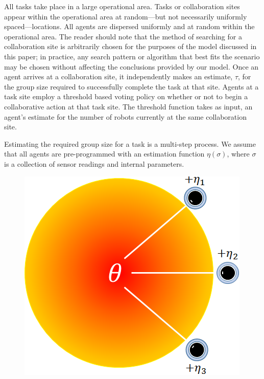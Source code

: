 \documentclass[conference]{IEEETran}
\begin{document}
All tasks take place in a large operational area. Tasks or collaboration sites appear within the operational area at random---but not necessarily uniformly spaced---locations. All agents are dispersed uniformly and at random within the operational area. The reader should note that the method of searching for a collaboration site is arbitrarily chosen for the purposes of the model discussed in this paper; in practice, any search pattern or algorithm that best fits the scenario may be chosen without affecting the conclusions provided by our model. Once an agent arrives at a collaboration site, it independently makes an estimate, $\tau$, for the group size required to successfully complete the task at that site. Agents at a task site employ a threshold based voting policy on whether or not to begin a collaborative action at that task site. The threshold function takes as input, an agent's estimate for the number of robots currently at the same collaboration site.

Estimating the required group size for a task is a multi-step process. We assume that all agents are pre-programmed with an estimation function $\eta(\sigma)$, where $\sigma$ is a collection of sensor readings and internal parameters.

\begin{figure}
\centering\includegraphics[width=\columnwidth]{../figures/globalgamesetup.png}
\centering\caption{}\label{fig:ggsetup}
\end{figure}
\end{document}
